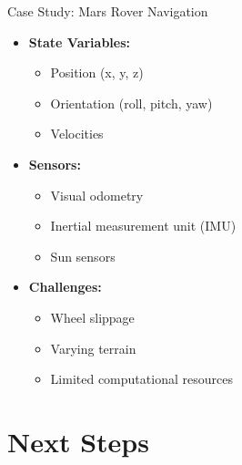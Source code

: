 \documentclass[aspectratio=169]{beamer}
\begin{document}
\begin{frame}{Case Study: Mars Rover Navigation}
    \begin{itemize}
        \item<1-> \textbf{State Variables:}
            \begin{itemize}
                \item Position (x, y, z)
                \item Orientation (roll, pitch, yaw)
                \item Velocities
            \end{itemize}
        \item<2-> \textbf{Sensors:}
            \begin{itemize}
                \item Visual odometry
                \item Inertial measurement unit (IMU)
                \item Sun sensors
            \end{itemize}
        \item<3-> \textbf{Challenges:}
            \begin{itemize}
                \item Wheel slippage
                \item Varying terrain
                \item Limited computational resources
            \end{itemize}
    \end{itemize}
\end{frame}

\section{Next Steps}
\end{document}
